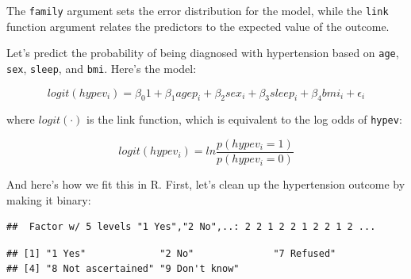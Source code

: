 \documentclass[]{book}
\newenvironment{Shaded}{\begin{snugshade}}{\end{snugshade}}
\newcommand{\CommentTok}[1]{\textcolor[rgb]{0.56,0.35,0.01}{\textit{#1}}}
\newcommand{\DataTypeTok}[1]{\textcolor[rgb]{0.13,0.29,0.53}{#1}}
\newcommand{\KeywordTok}[1]{\textcolor[rgb]{0.13,0.29,0.53}{\textbf{#1}}}
\newcommand{\NormalTok}[1]{#1}
\newcommand{\OperatorTok}[1]{\textcolor[rgb]{0.81,0.36,0.00}{\textbf{#1}}}
\newcommand{\StringTok}[1]{\textcolor[rgb]{0.31,0.60,0.02}{#1}}
\begin{document}
The \texttt{family} argument sets the error distribution for the model, while the \texttt{link} function
argument relates the predictors to the expected value of the outcome.

Let's predict the probability of being diagnosed with hypertension based on \texttt{age}, \texttt{sex}, \texttt{sleep}, and \texttt{bmi}.
Here's the model:

\[
logit(hypev_i) = \beta_{0}1 + \beta_1agep_i + \beta_2sex_i + \beta_3sleep_i + \beta_4bmi_i + \epsilon_i 
\]

where \(logit(\cdot)\) is the link function, which is equivalent to the log odds of \texttt{hypev}:

\[
logit(hypev_i) = ln \frac{p(hypev_i = 1)}{p(hypev_i = 0)}
\]

And here's how we fit this in R. First, let's clean up the hypertension outcome by making it binary:

\begin{Shaded}
\end{Shaded}

\begin{verbatim}
##  Factor w/ 5 levels "1 Yes","2 No",..: 2 2 1 2 2 1 2 2 1 2 ...
\end{verbatim}

\begin{Shaded}
\end{Shaded}

\begin{verbatim}
## [1] "1 Yes"             "2 No"              "7 Refused"        
## [4] "8 Not ascertained" "9 Don't know"
\end{verbatim}

\begin{Shaded}
\end{Shaded}
\end{document}
